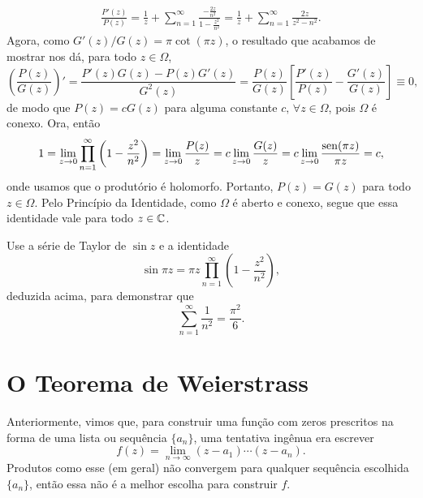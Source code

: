 \begin{exemplo}
        \begin{align*}
            \frac{P'(z)}{P(z)} =
            \frac{1}{z} + \sum_{n=1}^{\infty} \frac{ -\frac{2z}{n^2} }{ 1 - \frac{z^2}{n^2} }
            = \frac{1}{z} + \sum_{n=1}^{\infty} \frac{2z}{z^2 - n^2}.
        \end{align*}
        Agora, como $G'(z)/G(z) = \pi\cot(\pi z)$, o resultado que acabamos de mostrar
        nos dá, para todo $z\in\Omega$,
        \begin{equation*}
            \left( \frac{P(z)}{G(z)} \right)'
            = \frac{ P'(z)G(z) - P(z)G'(z) }{ G^2(z) }
            = \frac{P(z)}{G(z)}\left[ \frac{P'(z)}{P(z)} - \frac{G'(z)}{G(z)} \right]
            \equiv 0,
        \end{equation*}
        de modo que $P(z) = cG(z)$ para alguma constante $c, \, \forall z\in\Omega$,
        pois $\Omega$ é conexo. 
        Ora, então
        \begin{equation*}
            1 
            = \lim_{z\to 0} \prod_{n=1}^{\infty} \left( 1 - \frac{z^2}{n^2} \right)
            = \lim_{z\to 0} \frac{P(z)}{z} 
            = c\lim_{z\to 0} \frac{G(z)}{z}
            = c\lim_{z\to 0} \frac{\operatorname{sen}(\pi z)}{\pi z}
            = c,
        \end{equation*}
        onde usamos que o produtório é holomorfo.
        Portanto, $P(z) = G(z)$ para todo $z\in\Omega$. Pelo Princípio da Identidade,
        como $\Omega$ é aberto e conexo, segue que essa identidade vale para todo
        $z\in\mathbb{C}$.
    \end{exemplo}
    \begin{exercicio}
        Use a série de Taylor de $\sin z$ e a identidade 
        \[
          \sin \pi z = \pi z\prod_{n=1}^\infty \left(1 - \frac{z^2}{n^2}\right),
        \]
        deduzida acima, para demonstrar que 
        \[
          \sum_{n=1}^\infty \frac{1}{n^2} = \frac{\pi^2}{6}.
        \]
    \end{exercicio}
    
\section{O Teorema de Weierstrass}
    
    Anteriormente, vimos que, para construir uma função com zeros prescritos 
    na forma de uma lista ou sequência $\{a_n\}$, uma tentativa ingênua era escrever
    $$ f(z) = \lim_{n \to \infty} (z-a_1) \cdots (z-a_n).$$
    Produtos como esse (em geral) não convergem para qualquer sequência 
    escolhida $\{a_n\}$, então essa não é a melhor escolha para construir $f$. 
    
